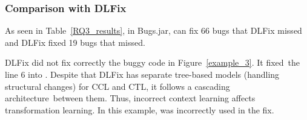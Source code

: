 \subsubsection{\bf Comparison with DLFix}

As seen in Table~\ref{RQ3_results}, in Bugs.jar, {\tool} can fix 66
bugs that DLFix missed and DLFix fixed 19 bugs that {\tool}
missed.

DLFix did not fix correctly the buggy code in
Figure~\ref{example_3}. It fixed~the line 6 into    \code{\%}
. Despite that DLFix has separate tree-based models
(handling structural changes) for CCL and CTL,
it follows a cascading architecture~between them.
Thus, incorrect context learning affects transformation
learning. In this example,  was incorrectly used in the
fix.













